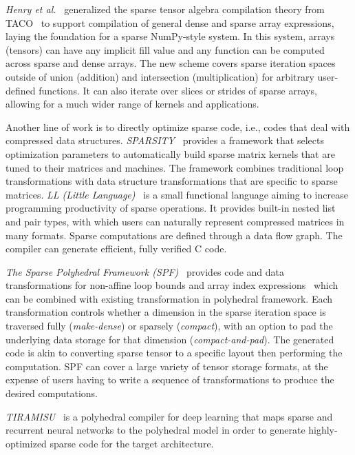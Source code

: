 \documentclass[10pt]{article}
\begin{document}
\emph{Henry et al.}~\cite{henry2021compilation} generalized the sparse tensor algebra compilation theory from TACO~\cite{taco2017} to support compilation of general dense and sparse array expressions, laying the foundation for a sparse NumPy-style system. In this system, arrays (tensors) can have any implicit fill value and any function can be computed across sparse and dense arrays. The new scheme covers sparse iteration spaces outside of union (addition) and intersection (multiplication) for arbitrary user-defined functions. It can also iterate over slices or strides of sparse arrays, allowing for a much wider range of kernels and applications.

Another line of work is to directly optimize sparse code, i.e., codes that deal with compressed data structures. \emph{SPARSITY}~\cite{im2004sparsity} provides a framework that selects optimization parameters to automatically build sparse matrix kernels that are tuned to their matrices and machines. The framework combines traditional loop transformations with data structure transformations that are specific to sparse matrices. \emph{LL (Little Language)}~\cite{arnold2011ll} is a small functional language aiming to increase programming productivity of sparse operations. It provides built-in nested list and pair types, with which users can naturally represent compressed matrices in many formats. Sparse computations are defined through a data flow graph. The compiler can generate efficient, fully verified C code.

\emph{The Sparse Polyhedral Framework (SPF)}~\cite{strout2018spf} provides code and data transformations for non-affine loop bounds and array index expressions~\cite{venkat2015loop} which can be combined with existing transformation in polyhedral framework. Each transformation controls whether a dimension in the sparse iteration space is traversed fully (\emph{make-dense}) or sparsely (\emph{compact}), with an option to pad the underlying data storage for that dimension (\emph{compact-and-pad}). The generated code is akin to converting sparse tensor to a specific layout then performing the computation. SPF can cover a large variety of tensor storage formats, at the expense of users having to write a sequence of transformations to produce the desired computations.

\emph{TIRAMISU}~\cite{baghdadi2020tiramisu} is a polyhedral compiler for deep learning that maps sparse and recurrent neural networks to the polyhedral model in order to generate highly-optimized sparse code for the target architecture.
\end{document}
